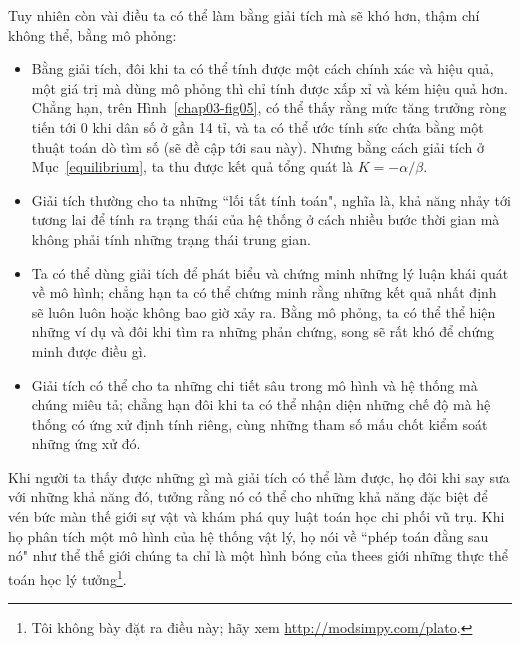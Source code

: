 \documentclass[12pt, openany]{book}
\theoremstyle{exercise}
\begin{document}
Tuy nhiên còn vài điều ta có thể làm bằng giải tích mà sẽ khó hơn, thậm chí không thể, bằng mô phỏng:

\begin{itemize}

\item Bằng giải tích, đôi khi ta có thể tính được một cách chính xác và hiệu quả, một giá trị mà dùng mô phỏng thì chỉ tính được xấp xỉ và kém hiệu quả hơn. Chẳng hạn, trên Hình~\ref{chap03-fig05}, có thể thấy rằng mức tăng trưởng ròng tiến tới 0 khi dân số ở gần 14 tỉ, và ta có thể ước tính sức chứa bằng một thuật toán dò tìm số (sẽ đề cập tới sau này). Nhưng bằng cách giải tích ở Mục~\ref{equilibrium}, ta thu được kết quả tổng quát là $K=-\alpha/\beta$.

\item Giải tích thường cho ta những ``lối tắt tính toán", nghĩa là, khả năng nhảy tới tương lai để tính ra trạng thái của hệ thống ở cách nhiều bước thời gian mà không phải tính những trạng thái trung gian.


\item Ta có thể dùng giải tích để phát biểu và chứng minh những lý luận khái quát về mô hình; chẳng hạn ta có thể chứng minh rằng những kết quả nhất định sẽ luôn luôn hoặc không bao giờ xảy ra. Bằng mô phỏng, ta có thể thể hiện những ví dụ và đôi khi tìm ra những phản chứng, song sẽ rất khó để chứng minh được điều gì.


\item Giải tích có thể cho ta những chi tiết sâu trong mô hình và hệ thống mà chúng miêu tả; chẳng hạn đôi khi ta có thể nhận diện những chế độ mà hệ thống có ứng xử định tính riêng, cùng những tham số mấu chốt kiểm soát những ứng xử đó.


\end{itemize}

Khi người ta thấy được những gì mà giải tích có thể làm được, họ đôi khi say sưa với những khả năng đó, tưởng rằng nó có thể cho những khả năng đặc biệt để vén bức màn thế giới sự vật và khám phá quy luật toán học chi phối vũ trụ. Khi họ phân tích một mô hình của hệ thống vật lý, họ nói về ``phép toán đằng sau nó" như thể thế giới chúng ta chỉ là một hình bóng của thees giới những thực thể toán học lý tưởng\footnote{Tôi không bày đặt ra điều này; hãy xem  \url{http://modsimpy.com/plato}.}.
\end{document}
